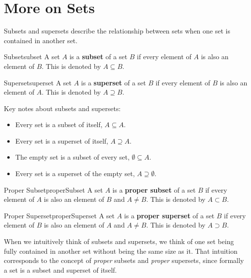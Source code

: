 \section{More on Sets}
Subsets and supersets describe the relationship between sets when one set is contained in
another set.

\begin{definition}{Subset}{subset}
  A set \( A \) is a \textbf{subset} of a set \( B \) if every element of
  \( A \) is also an element of \( B \).  This is denoted by \( A \subseteq B \).
\end{definition}

\begin{definition}
    {Superset}{superset}
    A set \( A \) is a \textbf{superset} of a set \( B \) if every element of
    \( B \) is also an element of \( A \). This is denoted by \( A \supseteq B \).
\end{definition}

Key notes about subsets and supersets:
\begin{itemize}
  \item Every set is a subset of itself, \( A \subseteq A \).
  \item Every set is a superset of itself, \( A \supseteq A \).
  \item The empty set is a subset of every set, \( \emptyset \subseteq A \).
  \item Every set is a superset of the empty set, \( A \supseteq \emptyset \).
\end{itemize}


\begin{definition}{Proper Subset}{properSubset}
  A set \( A \) is a \textbf{proper subset} of a set \( B \) if every element of
  \( A \) is also an element of \( B \) and \( A \neq B \). This is denoted by
  \( A \subset B \).
\end{definition}

\begin{definition}
    {Proper Superset}{properSuperset}
    A set \( A \) is a \textbf{proper superset} of a set \( B \) if every element of
    \( B \) is also an element of \( A \) and \( A \neq B \). This is denoted by
    \( A \supset B \).
\end{definition}

When we intuitively think of subsets and supersets, we think of one set being
fully contained in another set without being the same size as it. That intuition
corresponds to the concept of \emph{proper} subsets and \emph{proper} supersets,
since formally a set is a subset and superset of itself.

